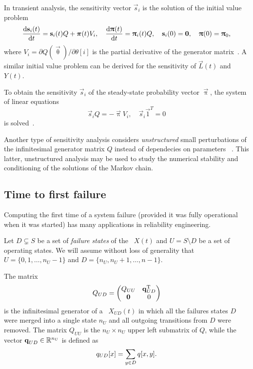 In transient analysis, the sensitivity vector $\vec{s}_i$ is the
solution of the initial value problem
\begin{equation}
  \frac{\mathrm{d} \bm{\mathrm{s}}_i(t)}{\mathrm{d} t} = \bm{\mathrm{s}}_i(t) Q + \bm{\mathrm{\pi}}(t) V_i,
  \quad \frac{\mathrm{d} \bm{\mathrm{\uppi}}(t)}{\mathrm{d} t} = \bm{\mathrm{\uppi}}_i(t) Q,
  \quad \bm{\mathrm{s}}_i(0) = \bm{\mathrm{0}}, \quad \bm{\mathrm{\uppi}}(0) = \bm{\mathrm{\uppi}}_0
  \text,
\end{equation}
where $V_i = \partial Q(\vec{\uptheta}) / \partial \theta[i]$ is the
partial derivative of the generator
matrix~\citep{DBLP:conf/sigmetrics/RameshT93}. A similar initial value
problem can be derived for the sensitivity of $\vec{L}(t)$ and $Y(t)$.

To obtain the sensitivity $\vec{s}_i$ of the steady-state probability
vector $\vec{\uppi}$, the system of linear equations
\begin{equation}
  \label{eq:background:ctmc:sensitvity:s}
  \vec{s}_i Q = -\vec{\uppi} V_i, \quad \vec{s}_i \vec{1}^T = 0
\end{equation}
is solved~\citep{DBLP:conf/sigmetrics/BlakeRT88}.

Another type of sensitivity analysis considers \emph{unstructured}
small perturbations of the infinitesimal generator matrix $Q$ instead
of dependecies on parameters%
~\citep{funderlic1986sensitivity,ipsen1994uniform}. This latter,
unstructured analysis may be used to study the numerical stability and
conditioning of the solutions of the Markov chain.

\subsection{Time to first failure}
\label{ssec:background:mtff}

Computing the first time of a system failure (provided it was fully operational when it was started) has many applications in reliability engineering.

Let $D \subsetneq S$ be a set of \emph{failure states} of the \CTMC\ 
$X(t)$ and $U = S \setminus D$ be a set of operating states. We will
assume without loss of generality that $U = \{0, 1, \ldots, n_U - 1\}$
and $D = \{ n_U, n_U + 1, \ldots, n - 1 \}$.

The matrix
\begin{equation}
  Q_{UD} = \begin{pmatrix}
    Q_{UU} & \bm{\mathrm{q}}_{UD}^{\mathrm{T}} \\
    \bm{\mathrm{0}} & 0
  \end{pmatrix}
\end{equation}
is the infinitesimal generator of a \CTMC\ $X_{UD}(t)$ in which all
the failures states $D$ were merged into a single state $n_U$ and all
outgoing transitions from $D$ were removed. The matrix $Q_{UU}$ is the
$n_U \times n_U$ upper left submatrix of $Q$, while the vector
$\bm{\mathrm{q}}_{UD} \in \mathbb{R}^{n_U}$ is defined as
\begin{equation}
  q_{UD}[x] = \sum_{y \in D} q[x, y] \text.
\end{equation}

